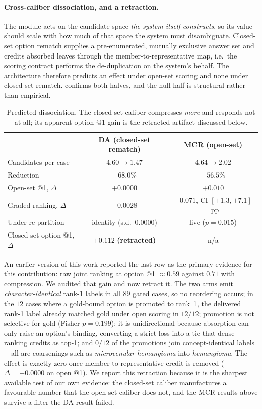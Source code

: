 \paragraph{Cross-caliber dissociation, and a retraction.}
The module acts on the candidate space \emph{the system itself constructs}, so its value should scale with how much of that space the system must disambiguate.
Closed-set option rematch supplies a pre-enumerated, mutually exclusive answer set and credits absorbed leaves through the member-to-representative map, i.e.\ the scoring contract performs the de-duplication on the system's behalf.
The architecture therefore predicts an effect under open-set scoring and none under closed-set rematch.
 confirms both halves, and the null half is structural rather than empirical.

\begin{table}[t]
\centering
\small
\caption{Predicted dissociation. The closed-set caliber compresses \emph{more} and responds not at all; its apparent option-@1 gain is the retracted artifact discussed below.}
\label{tab:eq-dissoc}
\begin{tabular}{lcc}
\toprule
 & DA (closed-set rematch) & MCR (open-set) \\
\midrule
Candidates per case & $4.60 \rightarrow 1.47$ & $4.64 \rightarrow 2.02$ \\
Reduction & $-68.0\%$ & $-56.5\%$ \\
Open-set @1, $\Delta$ & $+0.0000$ & $+0.010$ \\
Graded ranking, $\Delta$ & $-0.0028$ & $+0.071$, CI $[+1.3,+7.1]$~pp \\
Under re-partition & identity (s.d.\ $0.0000$) & live ($p=0.015$) \\
Closed-set option @1, $\Delta$ & $+0.112$ \textbf{(retracted)} & n/a \\
\bottomrule
\end{tabular}
\end{table}

An earlier version of this work reported the last row as the primary evidence for this contribution: raw joint ranking at option @1 $\approx 0.59$ against $0.71$ with compression.
We audited that gain and now retract it.
The two arms emit \emph{character-identical} rank-1 labels in all $89$ gated cases, so no reordering occurs; in the $12$ cases where a gold-bound option is promoted to rank~1, the delivered rank-1 label already matched gold under open scoring in $12/12$; promotion is not selective for gold (Fisher $p=0.199$); it is unidirectional because absorption can only raise an option's binding, converting a strict loss into a tie that dense ranking credits as top-1; and $0/12$ of the promotions join concept-identical labels---all are coarsenings such as \emph{microvenular hemangioma} into \emph{hemangioma}.
The effect is exactly zero once member-to-representative credit is removed ($\Delta = +0.0000$ on open @1).
We report this retraction because it is the sharpest available test of our own evidence: the closed-set caliber manufactures a favourable number that the open-set caliber does not, and the MCR results above survive a filter the DA result failed.

